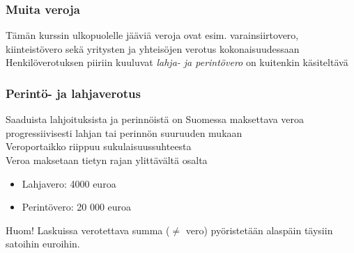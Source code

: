 \documentclass{beamer}
\newcommand{\pblock}{\\ \vspace{0.5cm}\pause}
\begin{document}
\begin{frame}
\frametitle{Muita veroja}
\pause
Tämän kurssin ulkopuolelle jääviä veroja ovat esim. varainsiirtovero,  kiinteistövero sekä yritysten ja yhteisöjen verotus kokonaisuudessaan
\pblock
Henkilöverotuksen piiriin kuuluvat \emph{lahja- ja perintövero} on kuitenkin käsiteltävä


\end{frame}

\begin{frame}
	\frametitle{Perintö- ja lahjaverotus}
	\pause
	Saaduista lahjoituksista ja perinnöistä on Suomessa maksettava veroa progressiivisesti lahjan tai perinnön suuruuden mukaan
	\pblock
	Veroportaikko riippuu sukulaisuussuhteesta
	\pblock
	Veroa maksetaan tietyn rajan ylittävältä osalta
	\begin{itemize}
		\item Lahjavero: 4000 euroa
		\item Perintövero: 20 000 euroa
	\pblock
	\end{itemize}
	
	Huom! Laskuissa verotettava summa (\(\neq\) vero) pyöristetään alaspäin täysiin satoihin euroihin.
\end{frame}
\end{document}
